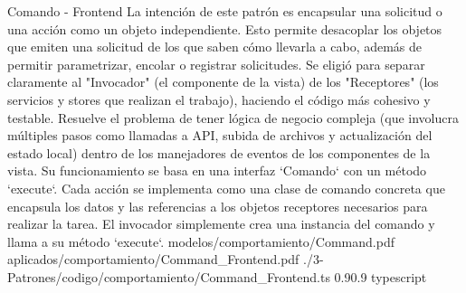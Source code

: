 \Patron
    {Comando - Frontend}
    {La intención de este patrón es encapsular una solicitud o una acción como un objeto independiente. Esto permite desacoplar los objetos que emiten una solicitud de los que saben cómo llevarla a cabo, además de permitir parametrizar, encolar o registrar solicitudes. Se eligió para separar claramente al "Invocador" (el componente de la vista) de los "Receptores" (los servicios y stores que realizan el trabajo), haciendo el código más cohesivo y testable.}
    {Resuelve el problema de tener lógica de negocio compleja (que involucra múltiples pasos como llamadas a API, subida de archivos y actualización del estado local) dentro de los manejadores de eventos de los componentes de la vista. Su funcionamiento se basa en una interfaz `Comando` con un método `execute`. Cada acción se implementa como una clase de comando concreta que encapsula los datos y las referencias a los objetos receptores necesarios para realizar la tarea. El invocador simplemente crea una instancia del comando y llama a su método `execute`.}
    {modelos/comportamiento/Command.pdf}
    {aplicados/comportamiento/Command_Frontend.pdf}
    {./3-Patrones/codigo/comportamiento/Command_Frontend.ts}
    {0.9}{0.9}
    {typescript}
\newpage


